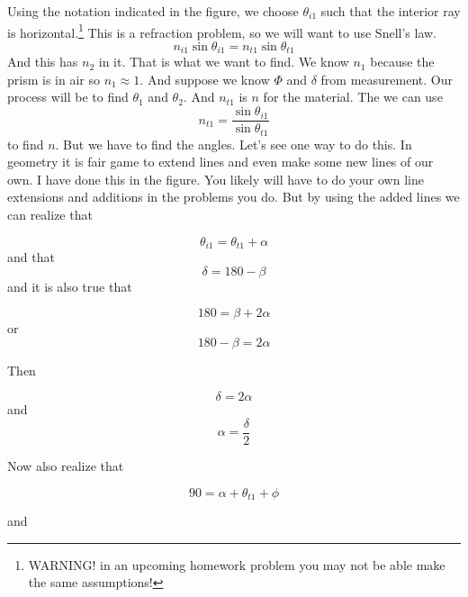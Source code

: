 \documentclass{article}
\begin{document}
Using the notation indicated in the figure, we choose $\theta _{i1}$ such
that the interior ray is horizontal.\footnote{%
WARNING! in an upcoming homework problem you may not be able make the same
assumptions!} This is a refraction problem, so we will want to use Snell's
law. 
\[
n_{i1}\sin \theta _{i1}=n_{t1}\sin \theta _{t1}
\]%
And this has $n_{2}$ in it. That is what we want to find. We know $n_{1}$
because the prism is in air so $n_{1}\approx 1.$ And suppose we know $\Phi $
and $\delta $ from measurement. Our process will be to find $\theta _{1}$
and $\theta _{2}.$ And $n_{t1}$ is $n$ for the material. The we can use 
\[
n_{t1}=\frac{\sin \theta _{i1}}{\sin \theta _{t1}}
\]%
to find $n.$ But we have to find the angles. Let's see one way to do this.
In geometry it is fair game to extend lines and even make some new lines of
our own. I have done this in the figure. You likely will have to do your own
line extensions and additions in the problems you do. But by using the added
lines we can realize that

\begin{equation}
\theta _{i1}=\theta _{t1}+\alpha
\end{equation}%
and that 
\begin{equation}
\delta =180-\beta
\end{equation}%
and it is also true that

\begin{equation}
180=\beta +2\alpha
\end{equation}%
or 
\begin{equation}
180-\beta =2\alpha
\end{equation}

Then

\begin{equation}
\delta =2\alpha
\end{equation}%
and%
\begin{equation}
\alpha =\frac{\delta }{2}
\end{equation}

Now also realize that

\begin{equation}
90=\alpha +\theta _{t1}+\phi
\end{equation}

and
\end{document}
